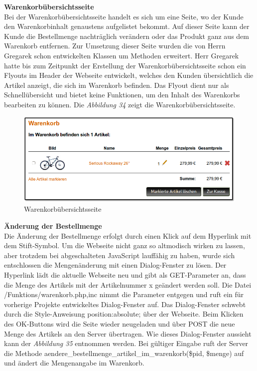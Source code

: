 \textbf{Warenkorbübersichtsseite}\\
Bei der Warenkorbübersichtsseite handelt es sich um eine Seite, wo der Kunde den Warenkorbinhalt genaustens aufgelistet bekommt. Auf dieser Seite kann der Kunde die Bestellmenge nachträglich verändern oder das Produkt ganz aus dem Warenkorb entfernen.
Zur Umsetzung dieser Seite wurden die von Herrn Gregarek schon entwickelten Klassen um Methoden erweitert. Herr Gregarek hatte bis zum Zeitpunkt der Erstellung der Warenkorbübersichtsseite schon ein Flyouts im Header der Webseite entwickelt, welches den Kunden übersichtlich die Artikel anzeigt, die sich im Warenkorb befinden. Das Flyout dient nur als Schnellübersicht und bietet keine Funktionen, um den Inhalt des Warenkorbs bearbeiten zu können. Die \textit{Abbildung 34} zeigt die Warenkorbübersichtsseite.

\begin{figure}[H]
	\begin{center}
			\includegraphics[width=130mm]{Bilder/warenkorb.png}
	\end{center}
	\caption{Warenkorbübersichtsseite}
\end{figure}

\textbf{Änderung der Bestellmenge}\\
Die Änderung der Bestellmenge erfolgt durch einen Klick auf dem Hyperlink mit dem Stift-Symbol. Um die Webseite nicht ganz so altmodisch wirken zu lassen, aber trotzdem bei abgeschalteten JavaScript lauffähig zu haben, wurde sich entschlossen die Mengenänderung mit einen Dialog-Fenster zu lösen. Der Hyperlink lädt die aktuelle Webseite neu und gibt als \glqq GET-Parameter\grqq{} an, dass die Menge des Artikels mit der Artikelnummer x geändert werden soll. Die Datei \glqq /Funktions/warenkorb.php,inc\grqq{} nimmt die Parameter entgegen und ruft ein für vorherige Projekte entwickeltes Dialog-Fenster auf. Das Dialog-Fenster schwebt durch die Style-Anweisung \glqq position:absolute;\grqq{} über der  Webseite. Beim Klicken des \glqq OK\grqq{}-Buttons wird die Seite wieder neugeladen und über \glqq POST\grqq{} die neue Menge des Artikels an den Server übertragen. Wie dieses Dialog-Fenster aussieht kann der \textit{Abbildung 35} entnommen werden. Bei gültiger Eingabe ruft der Server die Methode \glqq aendere\_bestellmenge\_artikel\_im\_warenkorb(\$pid, \$menge)\grqq{} auf und ändert die Mengenangabe im Warenkorb.

